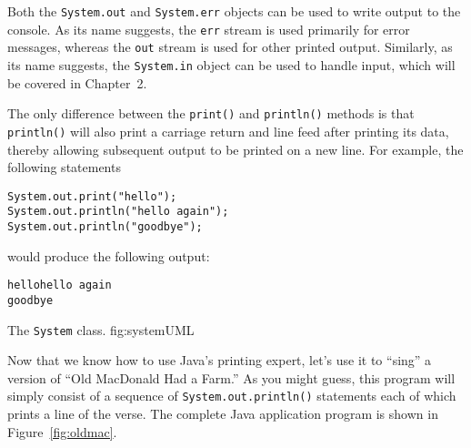 Both the {\tt System.out} and {\tt System.err} objects can be used to
write output to the console.  As its name suggests, the {\tt err}
stream is used primarily for error messages, whereas the {\tt out}
stream is used for other printed output.  Similarly, as its name
suggests, the {\tt System.in} object can be used to handle input,
which will be covered in Chapter~2.

The only difference between the {\tt print()} and {\tt println()}
methods is that {\tt println()} will also print a carriage return and
line feed after printing its data, thereby allowing subsequent output
to be printed on a new line.  For example, the following statements

\begin{jjjlisting}
\begin{lstlisting}
System.out.print("hello");         
System.out.println("hello again"); 
System.out.println("goodbye"); 
\end{lstlisting}
\end{jjjlisting}

\noindent would produce the following output:

\begin{jjjlisting}
\begin{lstlisting}
hellohello again
goodbye
\end{lstlisting}
\end{jjjlisting}

%
{The {\tt System} class.}
{fig:systemUML}


\noindent Now that we know how to use Java's printing expert,
let's use it to ``sing'' a version of ``Old MacDonald Had a
Farm.'' As you might guess, this program will simply consist of a
sequence of {\tt System.out.println()} statements each of which prints a
line of the verse.  The complete Java application program is shown in
Figure~\ref{fig:oldmac}.

